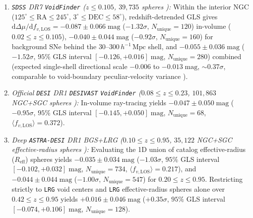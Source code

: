 \documentclass[11pt,a4paper]{article}
\begin{document}
\begin{enumerate}
    \item \textit{\texttt{SDSS} DR7 \texttt{VoidFinder} ($z \le 0.105$, $39,735$ spheres \cite{Douglass2023ApJS}):} Within the interior NGC ($125^\circ \le \mathrm{RA} \le 245^\circ$, $3^\circ \le \mathrm{DEC} \le 58^\circ$), redshift-detrended GLS gives $\mathrm{d}\Delta\mu/\mathrm{d}f_{v,\mathrm{LOS}} = -0.087 \pm 0.066\;\mathrm{mag}$ ($-1.32\sigma$, $N_{\mathrm{unique}} = 120$) in-volume ($0.02 \le z \le 0.105$), $-0.040 \pm 0.044\;\mathrm{mag}$ ($-0.92\sigma$, $N_{\mathrm{unique}} = 160$) for background SNe behind the $30\text{--}300\,h^{-1}\,\mathrm{Mpc}$ shell, and $-0.055 \pm 0.036\;\mathrm{mag}$ ($-1.52\sigma$, $95\%$ GLS interval $[-0.126, +0.016]\;\mathrm{mag}$, $N_{\mathrm{unique}} = 280$) combined (expected single-shell directional scale $-0.006$ to $-0.013\;\mathrm{mag}$, $\sim 0.37\sigma$, comparable to void-boundary peculiar-velocity variance \cite{Bolejko2013PRL}).
    \item \textit{Official \texttt{DESI} DR1 \texttt{DESIVAST} \texttt{VoidFinder} ($0.08 \le z \le 0.23$, $101,863$ NGC+SGC spheres \cite{DESIVAST2025}):} In-volume ray-tracing yields $-0.047 \pm 0.050\;\mathrm{mag}$ ($-0.95\sigma$, $95\%$ GLS interval $[-0.145, +0.050]\;\mathrm{mag}$, $N_{\mathrm{unique}} = 68$, $\langle f_{v,\mathrm{LOS}}\rangle = 0.372$).
    \item \textit{Deep \texttt{ASTRA-DESI} DR1 BGS+LRG ($0.10 \le z \le 0.95$, $35,122$ NGC+SGC effective-radius spheres \cite{ASTRADESI2025}):} Evaluating the 1D union of catalog effective-radius ($R_{\mathrm{eff}}$) spheres yields $-0.035 \pm 0.034\;\mathrm{mag}$ ($-1.03\sigma$, $95\%$ GLS interval $[-0.102, +0.032]\;\mathrm{mag}$, $N_{\mathrm{unique}} = 734$, $\langle f_{v,\mathrm{LOS}}\rangle = 0.217$), and $-0.044 \pm 0.044\;\mathrm{mag}$ ($-1.00\sigma$, $N_{\mathrm{unique}} = 547$) for $0.20 \le z \le 0.95$. Restricting strictly to \texttt{LRG} void centers and \texttt{LRG} effective-radius spheres alone over $0.42 \le z \le 0.95$ yields $+0.016 \pm 0.046\;\mathrm{mag}$ ($+0.35\sigma$, $95\%$ GLS interval $[-0.074, +0.106]\;\mathrm{mag}$, $N_{\mathrm{unique}} = 128$).
\end{enumerate}
\end{document}
